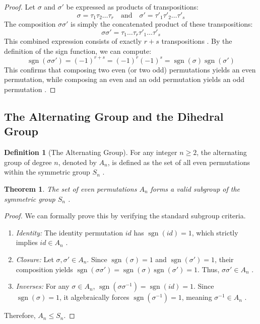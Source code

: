 \documentclass[11pt]{article}
\theoremstyle{definition}
\newtheorem{definition}{Definition}[section]
\theoremstyle{plain}
\newtheorem{theorem}{Theorem}[section]
\theoremstyle{remark}
\begin{document}
\begin{proof}
Let $\sigma$ and $\sigma'$ be expressed as products of transpositions:
\begin{equation}
    \sigma = \tau_1 \tau_2 \dots \tau_r \quad \text{and} \quad \sigma' = \tau'_1 \tau'_2 \dots \tau'_s
\end{equation}
The composition $\sigma \sigma'$ is simply the concatenated product of these transpositions:
\begin{equation}
    \sigma \sigma' = \tau_1 \dots \tau_r \tau'_1 \dots \tau'_s
\end{equation}
This combined expression consists of exactly $r + s$ transpositions \cite{dummit}. By the definition of the sign function, we can compute:
\begin{equation}
    \operatorname{sgn}(\sigma \sigma') = (-1)^{r+s} = (-1)^r (-1)^s = \operatorname{sgn}(\sigma) \operatorname{sgn}(\sigma')
\end{equation}
This confirms that composing two even (or two odd) permutations yields an even permutation, while composing an even and an odd permutation yields an odd permutation \cite{gallian}.
\end{proof}


\subsection{The Alternating Group and the Dihedral Group}

\begin{definition}[The Alternating Group]
For any integer $n \ge 2$, the alternating group of degree $n$, denoted by $A_n$, is defined as the set of all even permutations within the symmetric group $S_n$ \cite{dummit}.
\end{definition}

\begin{theorem}
The set of even permutations $A_n$ forms a valid subgroup of the symmetric group $S_n$ \cite{fraleigh}.
\end{theorem}

\begin{proof}
We can formally prove this by verifying the standard subgroup criteria.
\begin{enumerate}
    \item \emph{Identity:} The identity permutation $id$ has $\operatorname{sgn}(id) = 1$, which strictly implies $id \in A_n$ \cite{dummit}.
    \item \emph{Closure:} Let $\sigma, \sigma' \in A_n$. Since $\operatorname{sgn}(\sigma) = 1$ and $\operatorname{sgn}(\sigma') = 1$, their composition yields $\operatorname{sgn}(\sigma\sigma') = \operatorname{sgn}(\sigma)\operatorname{sgn}(\sigma') = 1$. Thus, $\sigma\sigma' \in A_n$ \cite{fraleigh}.
    \item \emph{Inverses:} For any $\sigma \in A_n$, $\operatorname{sgn}(\sigma\sigma^{-1}) = \operatorname{sgn}(id) = 1$. Since $\operatorname{sgn}(\sigma) = 1$, it algebraically forces $\operatorname{sgn}(\sigma^{-1}) = 1$, meaning $\sigma^{-1} \in A_n$ \cite{gallian}.
\end{enumerate}
Therefore, $A_n \leq S_n$.
\end{proof}
\end{document}
